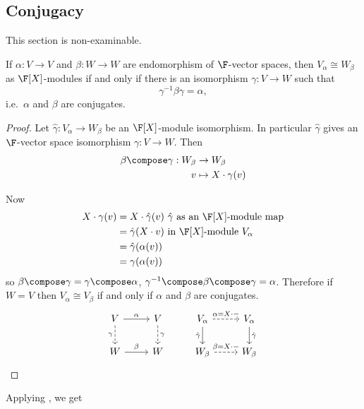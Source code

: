 \documentclass[a4paper]{article}
\begin{document}
\subsection{Conjugacy}

This section is non-examinable.

\begin{lemma}
  If \(\alpha: V \to V\) and \(\beta: W \to W\) are endomorphism of \(\F\)-vector spaces, then \(V_\alpha \cong W_\beta\) as \(\F[X]\)-modules if and only if there is an isomorphism \(\gamma: V \to W\) such that
  \[
    \gamma^{-1} \beta \gamma = \alpha,
  \]
  i.e.\ \(\alpha\) and \(\beta\) are conjugates.
\end{lemma}

\begin{proof}
  Let \(\hat \gamma: V_\alpha \to W_\beta\) be an \(\F[X]\)-module isomorphism. In particular \(\hat \gamma\) gives an \(\F\)-vector space isomorphism \(\gamma: V \to W\). Then
  \begin{align*}
    \beta \compose \gamma: W_\beta &\to W_\beta \\
    v &\mapsto X \cdot \gamma(v)
  \end{align*}

  Now
  \begin{align*}
    X \cdot \gamma(v) &= X \cdot \hat \gamma(v) \text{ \(\hat \gamma\) as an \(\F[X]\)-module map} \\
                      &= \hat \gamma(X \cdot v) \text{ in \(\F[X]\)-module \(V_\alpha\)} \\
                      &= \hat \gamma(\alpha(v)) \\
                      &= \gamma(\alpha(v))
  \end{align*}
  so \(\beta \compose \gamma = \gamma \compose \alpha\), \(\gamma^{-1} \compose \beta \compose \gamma = \alpha\). Therefore if \(W = V\) then \(V_\alpha \cong V_\beta\) if and only if \(\alpha\) and \(\beta\) are conjugates.
  \[
    \begin{tikzcd}
      V \ar[r, "\alpha"] \ar[d, dashed, "\gamma"'] & V \ar[d, dashed, "\gamma"] & V_\alpha \ar[r, dashed, "\alpha = X \cdot -"] \ar[d, "\hat \gamma"'] & V_\alpha \ar[d, "\hat \gamma"] \\
      W \ar[r, "\beta"] & W & W_\beta \ar[r, dashed, "\beta = X \cdot -"] & W_\beta
    \end{tikzcd}
  \]
\end{proof}

Applying , we get
\end{document}
